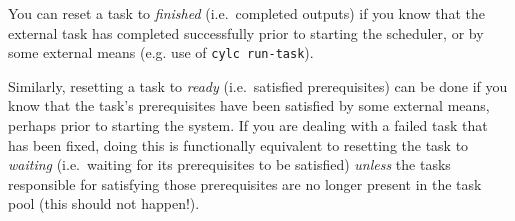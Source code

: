 You can reset a task to {\em finished} (i.e.\ completed outputs) if you
know that the external task has completed successfully prior to starting
the scheduler, or by some external means (e.g. use of
\lstinline=cylc run-task=).

Similarly, resetting a task to {\em ready} (i.e.\ satisfied
prerequisites) can be done if you know that the task's prerequisites
have been satisfied by some external means, perhaps prior to starting
the system.  If you are dealing with a failed task that has been fixed,
doing this is functionally equivalent to resetting the task to {\em
waiting} (i.e.\ waiting for its prerequisites to be satisfied) {\em
unless} the tasks responsible for satisfying those prerequisites are no
longer present in the task pool (this should not happen!).
